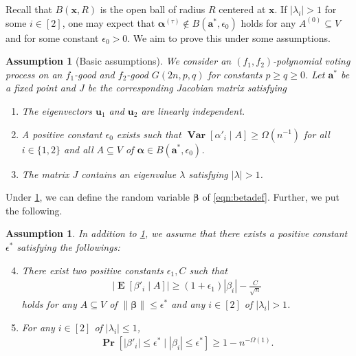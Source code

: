 \documentclass[letterpaper,11pt]{article}
\newtheorem{assumption}[theorem]{Assumption}
\renewcommand\Pr{\mathop{\mathbf{Pr}}}
\DeclareMathOperator{\E}{\mathbf{E}}
\newcommand{\Var}{\mathop{\mathbf{Var}}}%
\begin{document}
Recall that $B(\mathbf{x},R)$ is the open ball of radius $R$ centered at $\mathbf{x}$.
If $|\lambda_i|>1$ for some $i\in[2]$, one may expect that ${\boldsymbol \alpha}^{(\tau)}\not\in B(\mathbf{a}^*,\epsilon_0)$ holds for any $A^{(0)}\subseteq V$ and for some constant $\epsilon_0>0$.
We aim to prove this under some assumptions.

\begin{assumption}[Basic assumptions] \label{asm:escape_assumption0}
We consider an $(f_1,f_2)$-polynomial voting process on an $f_1$-good and $f_2$-good $G(2n,p,q)$ for constants $p\geq q\geq 0$.
Let $\mathbf{a}^*$ be a fixed point and $J$ be the corresponding Jacobian matrix satisfying
\begin{enumerate}[label={\rm (A\arabic*)}]
\item The eigenvectors $\mathbf{u}_1$ and $\mathbf{u}_2$ are linearly independent. \label{asm:asm1}
\item A positive constant $\epsilon_0$ exists such that $\Var[\alpha'_i\mid A]\geq \Omega(n^{-1})$ for all $i\in\{1,2\}$ and all $A\subseteq V$ of ${\boldsymbol \alpha}\in B\left(\mathbf{a}^*,\epsilon_0\right)$. \label{asm:asm2}
\item The matrix $J$ contains an eigenvalue $\lambda$ satisfying $|\lambda|>1$. \label{asm:asm3}
\end{enumerate}
\end{assumption}

Under \cref{asm:escape_assumption0}, we can define the random variable ${\boldsymbol \beta}$ of \cref{eqn:betadef}.
Further, we put the following.
\begin{assumption} \label{asm:escape_assumption1}
In addition to \cref{asm:escape_assumption0}, we assume that there exists a positive constant $\epsilon^*$ satisfying the followings:
\begin{enumerate}[label={\rm (A\arabic*)}]
\setcounter{enumi}{3}
\item There exist two positive constants $\epsilon_1,C$ such that
\begin{align*}
|\E[\beta'_i\mid A]|\geq (1+\epsilon_1)|\beta_i|-\frac{C}{\sqrt{n}}
\end{align*}
holds for any $A\subseteq V$ of $\|{\boldsymbol \beta}\|\leq \epsilon^*$ and any $i\in[2]$ of $|\lambda_i|>1$. \label{asm:asm4}
\item For any $i\in [2]$ of $|\lambda_i|\leq 1$,
\begin{align*}
\Pr[|\beta'_i|\leq \epsilon^*\mid |\beta_i|\leq \epsilon^*] \geq 1-n^{-\Omega(1)}.
\end{align*}
\label{asm:asm5}
\end{enumerate}
\end{assumption}
\end{document}
